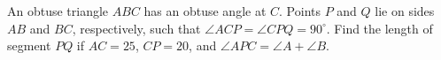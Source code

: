 An obtuse triangle $ABC$ has an obtuse angle at $C$. Points $P$ and $Q$ lie on sides $AB$ and $BC$, respectively, such that $\angle ACP=\angle CPQ=90^{\circ}$. Find the length of segment $PQ$ if $AC=25$, $CP=20$, and $\angle APC=\angle A+\angle B$.
